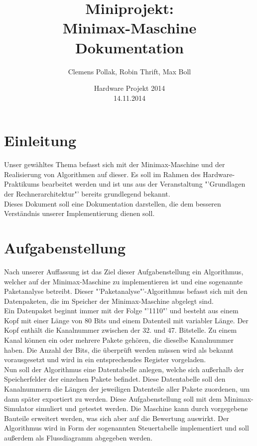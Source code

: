 \documentclass[12pt,titlepage]{article}
\begin{document}
\title{Miniprojekt: \\ Minimax-Maschine \\ Dokumentation}
\author{Clemens Pollak, Robin Thrift, Max Boll}
\date{Hardware Projekt 2014 \\ 14.11.2014}
\maketitle

\tableofcontents

\newpage

\section{Einleitung} 
Unser gew{\"a}hltes Thema befasst sich mit der Minimax-Maschine und der Realisierung von Algorithmen auf dieser. Es soll im Rahmen des Hardware-Praktikums bearbeitet werden und ist uns aus der Veranstaltung "'Grundlagen der Rechnerarchitektur"' bereits grundlegend bekannt.\\ Dieses Dokument soll eine Dokumentation darstellen, die dem besseren Verst{\"a}ndnis unserer Implementierung dienen soll.


\section{Aufgabenstellung}
Nach unserer Auffassung ist das Ziel dieser Aufgabenstellung ein Algorithmus, welcher auf der Minimax-Maschine zu implementieren ist und eine sogenannte Paketanalyse betreibt. Dieser "'Paketanalyse"'-Algorithmus befasst sich mit den Datenpaketen, die im Speicher der Minimax-Maschine abgelegt sind.\\ Ein Datenpaket beginnt immer mit der Folge "'1110"' und besteht aus einem
Kopf mit einer L{\"a}nge von 80 Bits und einem Datenteil mit variabler L{\"a}nge. Der Kopf enth{\"a}lt die Kanalnummer zwischen der 32. und 47. Bitstelle. Zu einem Kanal k{\"o}nnen ein oder mehrere Pakete geh{\"o}ren, die dieselbe Kanalnummer haben.
Die Anzahl der Bits, die überprüft werden müssen wird als bekannt vorausgesetzt und wird in ein entsprechendes Register vorgeladen.\\
Nun soll der Algorithmus eine Datentabelle anlegen, welche sich au{\ss}erhalb der Speicherfelder der einzelnen Pakete befindet. Diese Datentabelle soll den Kanalnummern die L{\"a}ngen der jeweiligen Datenteile aller Pakete zuordenen, um dann später exportiert zu werden. Diese Aufgabenstellung soll mit dem Minimax-Simulator simuliert und getestet werden. Die Maschine kann durch vorgegebene Bauteile erweitert werden, was sich aber auf die Bewertung auswirkt. Der Algorithmus wird in Form der sogenannten Steuertabelle implementiert und soll außerdem als Flussdiagramm abgegeben werden.
\end{document}
